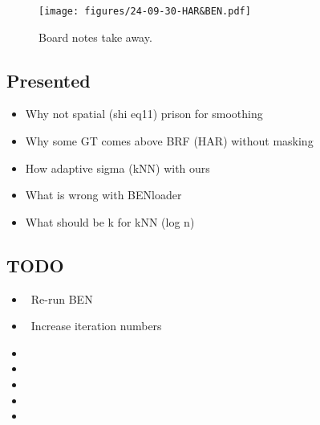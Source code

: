 
\begin{figure}[htbp]
    \centering
    \texttt{[image: figures/24-09-30-HAR\&BEN.pdf]}
    \caption{Board notes take away.}
    \label{fig:24-09-30-HAR&BEN}
\end{figure}

\begin{multicols}{2}
\subsection*{Presented}
\begin{itemize}
    \item Why not spatial (shi eq11) prison for smoothing 
    \item Why some GT comes above BRF (HAR) without masking
    \item How adaptive sigma (kNN) with ours
    \item What is wrong with BENloader
    \item What should be k for kNN (log n)
\end{itemize}

\subsection*{TODO}
\begin{itemize}
    \item \checkmark \ Re-run BEN
    \item \checkmark \ Increase iteration numbers
    \item {}
    \item {}
    \item {}
    \item {}
    \item {}
\end{itemize}
\end{multicols}

\newpage



